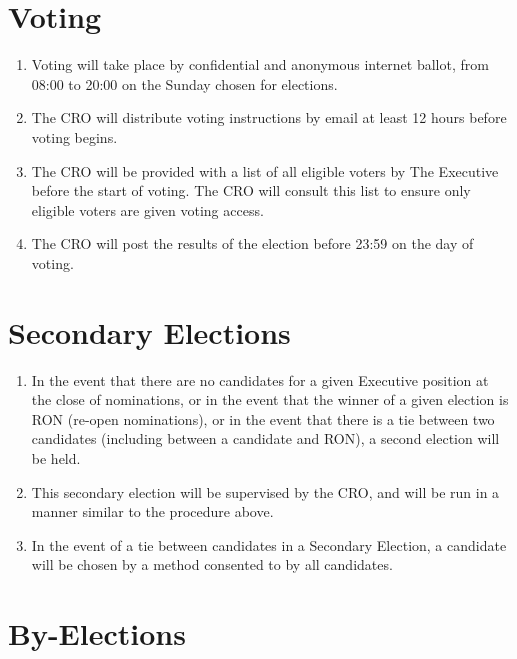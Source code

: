 \documentclass[11pt, a4paper]{article}
\begin{document}
\section{Voting}
\label{sec:voting}

\begin{enumerate}
    \item Voting will take place by confidential and anonymous internet ballot, from 08:00 to 20:00 on the Sunday chosen for elections.
    \item The CRO will distribute voting instructions by email at least 12 hours before voting begins.
    \item The CRO will be provided with a list of all eligible voters by The Executive before the start of voting. The CRO will consult this list to ensure only eligible voters are given voting access.
    \item The CRO will post the results of the election before 23:59 on the day of voting.
\end{enumerate}





\section{Secondary Elections}
\label{sec:secondary_elections}

\begin{enumerate}
    \item In the event that there are no candidates for a given Executive position at the close of nominations, or in the event that the winner of a given election is RON (re-open nominations), or in the event that there is a tie between two candidates (including between a candidate and RON),  a second election will be held.
    \item This secondary election will be supervised by the CRO, and will be run in a manner similar to the procedure above.
    \item In the event of a tie between candidates in a Secondary Election, a candidate will be chosen by a method consented to by all candidates.
\end{enumerate}





\section{By-Elections}
\label{sec:by_elections}
\end{document}
